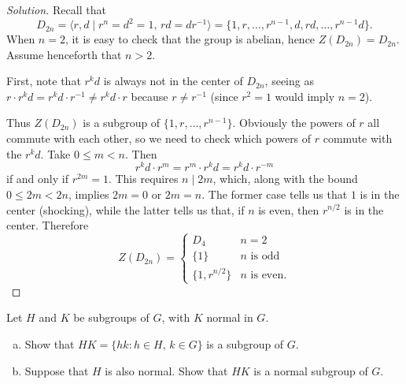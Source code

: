 \documentclass[11pt]{scrartcl}
\providecommand{\ii}{\item}
\providecommand{\inv}{^{-1}}
\newenvironment{soln}{\begin{proof}[Solution]}{\end{proof}}
\begin{document}
\begin{soln}
    Recall that
    \begin{equation*}
        D_{2n} = \langle r,d \mid r^n = d^2 = 1,\, rd = dr\inv\rangle
	= \{1, r,\dots, r^{n-1}, d, rd, \dots, r^{n-1}d\}.
    \end{equation*}
    When $n = 2$, it is easy to check that the group is abelian,
    hence $Z(D_{2n}) = D_{2n}$. Assume henceforth that $n > 2$.

    First, note that $r^kd$ is always not in the center of $D_{2n}$,
    seeing as $r\cdot r^kd = r^kd\cdot r\inv \ne r^kd\cdot r$ because $r\ne r\inv$
    (since $r^2=1$ would imply $n=2$).

    Thus $Z(D_{2n})$ is a subgroup of $\{1, r, \dots, r^{n-1}\}$.
    Obviously the powers of $r$ all commute with each other,
    so we need to check which powers of $r$ commute with the $r^kd$.
    Take $0 \le m < n$. Then
    \begin{equation*}
	r^kd\cdot r^m = r^m\cdot r^kd = r^kd\cdot r^{-m}
    \end{equation*}
    if and only if $r^{2m} = 1$. This requires $n\mid 2m$,
    which, along with the bound $0\le 2m < 2n$, implies
    $2m = 0$ or $2m = n$. The former case tells us that $1$ is in the center (shocking),
    while the latter tells us that, if $n$ is even, then $r^{n/2}$ is in the center.
    Therefore
    \begin{equation*}
	Z(D_{2n}) = \begin{cases}
	    D_4 & n = 2\\
	    \{1\} & n\text{ is odd}\\
	    \{1, r^{n/2}\} & n\text{ is even}.
	\end{cases}
    \end{equation*}
\end{soln}

\begin{problem}
    Let $H$ and $K$ be subgroups of $G$, with $K$ normal in $G$.
    \begin{enumerate}[(a)]
	\ii Show that $HK = \{hk : h\in H,\, k\in G\}$
	is a subgroup of $G$.
	\ii Suppose that $H$ is also normal.
	Show that $HK$ is a normal subgroup of $G$.
    \end{enumerate}
\end{problem}
\end{document}
